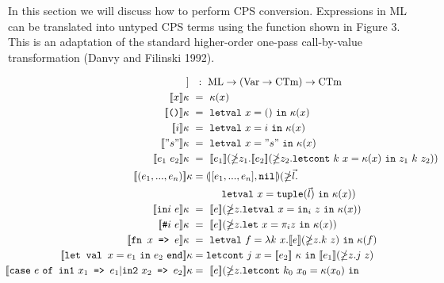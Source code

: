 \documentclass{article}
\theoremstyle{definition}
\theoremstyle{remark}
\numberwithin{equation}{section}
\begin{document}
In this section we will discuss how to perform CPS conversion.
Expressions in ML can be translated into untyped CPS
terms using the function shown in Figure 3. This is an adaptation
of the standard higher-order one-pass call-by-value transformation
(Danvy and Filinski 1992).

 \begin{figure}[!ht]
  \centering
\begin{align*}
 [\![\cdot]\!] \ &\ :\ \textrm{ML}\rightarrow(\textrm{Var}\rightarrow
    \textrm{CTm})\rightarrow \textrm{CTm}\\     %
   \env{x} \  &=\  \kappa (x)\\             %
 \env{\texttt{()}} \  &=\  \texttt{letval}\ x=()\ \texttt{in}\ \kappa (x)\\ %
 \env{i} \  &=\  \texttt{letval}\ x=i\ \texttt{in}\ \kappa (x)\\    %
 \env{"s"} \  &=\  \texttt{letval}\ x="s"\ \texttt{in}\ \kappa (x)\\    %
 \env{e_1\ e_2} \  &=\  [\![e_1]\!](\mathbb{\Lambda}z_1.[\![e_2]\!]
 (\mathbb{\Lambda}z_2.\texttt{letcont}\ k\ x=
    \kappa (x)\ \texttt{in}\ z_1\ k\ z_2))\\ %
  \env{(e_1, ... , e_n)}
        &=\round{[e_1, ... , e_n], \texttt{nil}}(\mathbb{\Lambda}\vec{l}.\\
        &\kern1cm \texttt{letval}\ x=\texttt{tuple}(\vec{l})\
        \texttt{in}\ \kappa (x))\\            %
   [\![\texttt{in}i\ e]\!]\kappa \  &=\  [\![e]\!](\mathbb{\Lambda}z.
        \texttt{letval}\ x=\texttt{in}_i\ z\ \texttt{in}\ \kappa (x))\\    %
  [\![\texttt{\#}i\ e]\!]\kappa \  &=\  [\![e]\!](\mathbb{\Lambda}z.
        \texttt{let}\ x=\pi_i z\ \texttt{in}\ \kappa (x))\\       %
  \env{\texttt{fn }x\texttt{ => }e}\  &=\ \texttt{letval}\ f=\lambda k\ x.[\![e]\!]
    (\mathbb{\Lambda}z.k\ z)\ \texttt{in}\ \kappa (f)\\     %
  [\![\texttt{let\ val }x=e_1\ \texttt{in}\ e_2\ \texttt{end}]\!]\kappa
   &= \texttt{letcont}\ j\ x=[\![e_2]\!]\ \kappa\ \texttt{in}
            \ [\![e_1]\!](\mathbb{\Lambda}z.j\ z)\\     %
  \kern-1.2cm [\![\texttt{case}\ e\ \texttt{of\ in1}\ x_1\texttt{ => }e_1|
        \texttt{in2}\ x_2\texttt{ => } e_2]\!]\kappa
     &=\ [\![e]\!](\mathbb{\Lambda}z.\texttt{letcont}\ k_0\ x_0=
            \kappa (x_0)\ \texttt{in}\\

\end{align*}
\end{figure}
\end{document}
